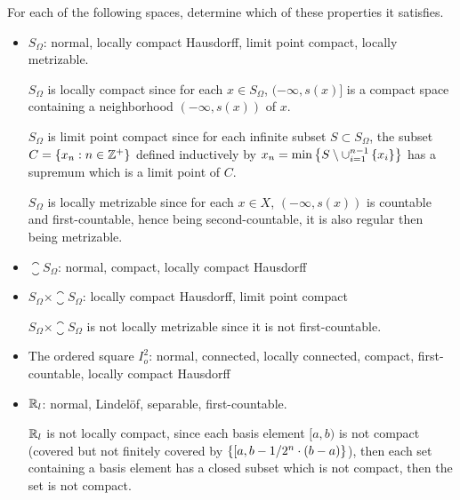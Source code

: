 \documentclass[12pt,a4paper]{article}
\begin{document}
    \begin{ex}
        For each of the following spaces, determine which of these properties it satisfies.
        \begin{itemize}
            \item $S_\Omega$: normal, locally compact Hausdorff, limit point compact, locally metrizable.
            \begin{remark}
                $S_\Omega$ is locally compact since for each $x\in S_\Omega$, $(-\infty,s(x)]$ is a compact space containing a neighborhood $(-\infty,s(x))$ of $x$.

                $S_\Omega$ is limit point compact since for each infinite subset $S\subset S_\Omega$, the subset $C=\left\{x_n:n\in\mathbb{Z}^+\right\}$ defined inductively by $x_n=\min\left\{S\setminus\cup_{i=1}^{n-1}\left\{x_i\right\}\right\}$ has a supremum which is a limit point of $C$.

                $S_\Omega$ is locally metrizable since for each $x\in X$, $(-\infty,s(x))$ is countable and first-countable, hence being second-countable, it is also regular then being metrizable.  
            \end{remark}
            \item $\closure{S}_\Omega$: normal, compact, locally compact Hausdorff
            \item $S_\Omega\times\closure{S}_\Omega$: locally compact Hausdorff, limit point compact
            \begin{remark}
                $S_\Omega\times\closure{S}_\Omega$ is not locally metrizable since it is not first-countable.
            \end{remark}
            \item The ordered square $I_o^2$: normal, connected, locally connected, compact, first-countable, locally compact Hausdorff
            \item $\mathbb{R}_l$: normal, Lindel\"of, separable, first-countable.
            \begin{remark}
                $\mathbb{R}_l$ is not locally compact, since each basis element $[a,b)$ is not compact (covered but not finitely covered by $\left\{[a,b-1/2^n\cdot(b-a)\right\}$), then each set containing a basis element has a closed subset which is not compact, then the set is not compact.
            \end{remark}
            

\end{itemize}
\end{ex}
\end{document}

